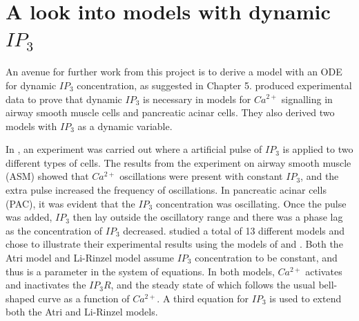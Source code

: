 \chapter{A look into models with dynamic ${IP_3}$}

An avenue for further work from this project is to derive a model with an ODE for dynamic $IP_3$ concentration, as suggested in Chapter 5.  produced experimental data to prove that dynamic $IP_3$ is necessary in models for $Ca^{2+}$ signalling in airway smooth muscle cells and pancreatic acinar cells. They also derived two models with $IP_3$ as a dynamic variable.  

In , an experiment was carried out where a artificial pulse of $IP_3$ is applied to two different types of cells. The results from the experiment on airway smooth muscle (ASM) showed that $Ca^{2+}$ oscillations were present with constant $IP_3$, and the extra pulse increased the frequency of oscillations. In pancreatic acinar cells (PAC), it was evident that the $IP_3$ concentration was oscillating. Once the pulse was added, $IP_3$ then lay outside the oscillatory range and there was a phase lag as the concentration of $IP_3$ decreased.  studied a total of 13 different models and chose to illustrate their experimental results using the models of  and . Both the Atri model and Li-Rinzel model assume $IP_3$ concentration to be constant, and thus is a parameter in the system of equations. In both models, $Ca^{2+}$ activates and inactivates the $IP_3R$, and the steady state of which follows the usual bell-shaped curve as a function of $Ca^{2+}$. A third equation for $IP_3$ is used to extend both the Atri and Li-Rinzel models. \\


